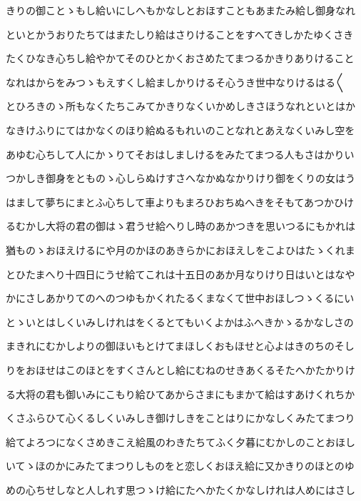 \documentclass[a4paper,11pt,landscape]{ltjtarticle}
\begin{document}
\par\medskip
きりの御ことゝもし給いにしへもかなしとおほすこともあまたみ給し御身なれ
\par\medskip
といとかうおりたちてはまたしり給はさりけることをすへてきしかたゆくさき
\par\medskip
たくひなき心ちし給やかてそのひとかくおさめたてまつるかきりありけること
\par\medskip
なれはからをみつゝもえすくし給ましかりけるそ心うき世中なりけるはる〱
\par\medskip
とひろきのゝ所もなくたちこみてかきりなくいかめしきさほうなれといとはか
\par\medskip
なきけふりにてはかなくのほり給ぬるもれいのことなれとあえなくいみし空を
\par\medskip
あゆむ心ちして人にかゝりてそおはしましけるをみたてまつる人もさはかりい
\par\medskip
つかしき御身をとものゝ心しらぬけすさへなかぬなかりけり御をくりの女はう
\par\medskip
はまして夢ちにまとふ心ちして車よりもまろひおちぬへきをそもてあつかひけ
\par\medskip
るむかし大将の君の御はゝ君うせ給へりし時のあかつきを思いつるにもかれは
\par\medskip
猶ものゝおほえけるにや月のかほのあきらかにおほえしをこよひはたゝくれま
\par\medskip
とひたまへり十四日にうせ給てこれは十五日のあか月なりけり日はいとはなや
\par\medskip
かにさしあかりてのへのつゆもかくれたるくまなくて世中おほしつゝくるにい
\par\medskip
とゝいとはしくいみしけれはをくるとてもいくよかはふへきかゝるかなしさの
\par\medskip
まきれにむかしよりの御ほいもとけてまほしくおもほせと心よはきのちのそし
\par\medskip
りをおほせはこのほとをすくさんとし給にむねのせきあくるそたへかたかりけ
\par\medskip
る大将の君も御いみにこもり給ひてあからさまにもまかて給はすあけくれちか
\par\medskip
くさふらひて心くるしくいみしき御けしきをことはりにかなしくみたてまつり
\par\medskip
給てよろつになくさめきこえ給風のわきたちてふく夕暮にむかしのことおほし
\par\medskip
いてゝほのかにみたてまつりしものをと恋しくおほえ給に又かきりのほとのゆ
\par\medskip
めの心ちせしなと人しれす思つゝけ給にたへかたくかなしけれは人めにはさし
\end{document}
